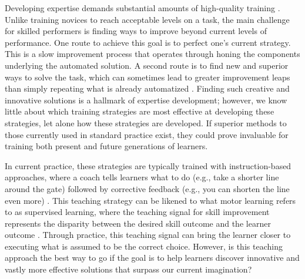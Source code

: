 \documentclass[pdflatex,sn-mathphys-num]{sn-jnl}%
\theoremstyle{thmstyleone}%
\theoremstyle{thmstyletwo}%
\theoremstyle{thmstylethree}%
\begin{document}
Developing expertise demands substantial amounts of high-quality training \cite{ericsson_role_1993, hodges_predicting_2004, vaeyens_talent_2009, sosniak_learning_1985}. Unlike training novices to reach acceptable levels on a task, the main challenge for skilled performers is finding ways to improve beyond current levels of performance\cite{ericsson_development_2003, ericsson_scientific_1998, gray_plateaus_2017, williams_expertise_2008, du_relationship_2022}. One route to achieve this goal is to perfect one's current strategy\cite{krakauer_motor_2019, du_relationship_2022}. This is a slow improvement process that operates through honing the components underlying the automated solution\cite{du_relationship_2022}. A second route is to find new and superior ways to solve the task, which can sometimes lead to greater improvement leaps than simply repeating what is already automatized \cite{gray_plateaus_2017, du_relationship_2022, krakauer_motor_2019}. Finding such creative and innovative solutions is a hallmark of expertise development\cite{ericsson_scientific_1998, ericsson_development_2003}; however, we know little about which training strategies are most effective at developing these strategies, let alone how these strategies are developed\cite{taylor_cerebellar_2014, taylor_role_2012}. If superior methods to those currently used in standard practice exist, they could prove invaluable for training both present and future generations of learners.

In current practice, these strategies are typically trained with instruction-based approaches, where a coach tells learners what to do (e.g., take a shorter line around the gate) followed by corrective feedback (e.g., you can shorten the line even more) \cite{williams_practice_2005, williams_effective_2023, hodges_role_1999}. This teaching strategy can be likened to what motor learning refers to as supervised learning, where the teaching signal for skill improvement represents the disparity between the desired skill outcome and the learner outcome \cite{jordan_forward_1992, wolpert_motor_2010, doya_complementary_2000}. Through practice, this teaching signal can bring the learner closer to executing what is assumed to be the correct choice. However, is this teaching approach the best way to go if the goal is to help learners discover innovative and vastly more effective solutions that surpass our current imagination?
\end{document}
